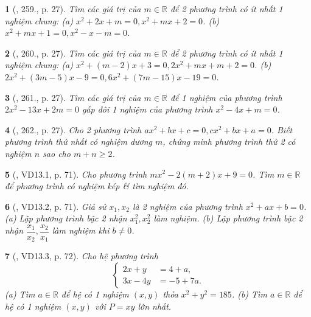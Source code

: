 \documentclass{article}
\newtheorem{baitoan}{}
\begin{document}
\begin{baitoan}[\cite{Binh_Toan_9_tap_2}, 259., p. 27]
	Tìm các giá trị của $m\in\mathbb{R}$ để 2 phương trình có ít nhất 1 nghiệm chung: (a) $x^2 + 2x + m = 0,x^2 + mx + 2 = 0$. (b) $x^2 + mx + 1 = 0,x^2 - x - m = 0$.
\end{baitoan}

\begin{baitoan}[\cite{Binh_Toan_9_tap_2}, 260., p. 27]
	Tìm các giá trị của $m\in\mathbb{R}$ để 2 phương trình có ít nhất 1 nghiệm chung: (a) $x^2 + (m - 2)x + 3 = 0,2x^2 + mx + m + 2 = 0$. (b) $2x^2 + (3m - 5)x - 9 = 0,6x^2 + (7m - 15)x - 19 = 0$.
\end{baitoan}

\begin{baitoan}[\cite{Binh_Toan_9_tap_2}, 261., p. 27]
	Tìm các giá trị của $m\in\mathbb{R}$ để 1 nghiệm của phương trình $2x^2 - 13x + 2m = 0$ gấp đôi 1 nghiệm của phương trình $x^2 - 4x + m = 0$.
\end{baitoan}

\begin{baitoan}[\cite{Binh_Toan_9_tap_2}, 262., p. 27]
	Cho 2 phương trình $ax^2 + bx + c = 0,cx^2 + bx + a = 0$. Biết phương trình thứ nhất có nghiệm dương $m$, chứng minh phương trình thứ 2 có nghiệm $n$ sao cho $m + n\ge2$.
\end{baitoan}

\begin{baitoan}[\cite{TLCT_THCS_Toan_9_dai_so}, VD13.1, p. 71]
	Cho phương trình $mx^2 - 2(m + 2)x + 9 = 0$. Tìm $m\in\mathbb{R}$ để phương trình có nghiệm kép \& tìm nghiệm đó.
\end{baitoan}

\begin{baitoan}[\cite{TLCT_THCS_Toan_9_dai_so}, VD13.2, p. 71]
	Giả sử $x_1,x_2$ là 2 nghiệm của phương trình $x^2 + ax + b = 0$. (a) Lập phương trình bậc 2 nhận $x_1^2,x_2^2$ làm nghiệm. (b) Lập phương trình bậc 2 nhận $\dfrac{x_1}{x_2},\dfrac{x_2}{x_1}$ làm nghiệm khi $b\ne0$.
\end{baitoan}

\begin{baitoan}[\cite{TLCT_THCS_Toan_9_dai_so}, VD13.3, p. 72]
	Cho hệ phương trình
	\begin{equation*}
		\left\{\begin{split}
			2x + y &= 4 + a,\\
			3x - 4y &= -5 + 7a.
		\end{split}\right.
	\end{equation*}
	(a) Tìm $a\in\mathbb{R}$ để hệ có 1 nghiệm $(x,y)$ thỏa $x^2 + y^2 = 185$. (b) Tìm $a\in\mathbb{R}$ để hệ có 1 nghiệm $(x,y)$ với $P = xy$ lớn nhất.
\end{baitoan}
\end{document}
